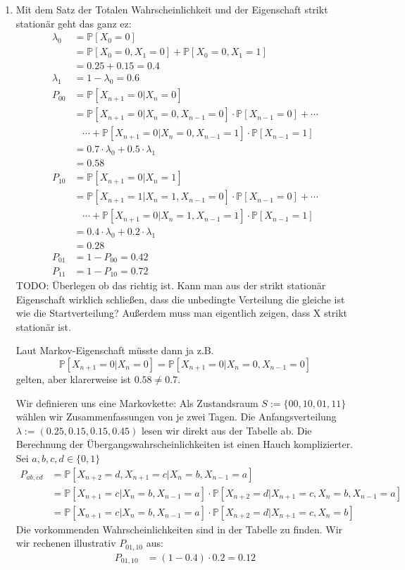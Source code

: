 \documentclass[a4paper,11pt,notitlepage,fullpage]{article}
\newcommand{\pp}[1]{\mathbb P\left[#1\right]}
\begin{document}
\begin{enumerate}
\item Mit dem Satz der Totalen Wahrscheinlichkeit und der Eigenschaft strikt stationär geht das ganz ez:
\begin{align*}
\lambda_0 &= \pp{X_0 = 0} \\
&= \pp{X_0 = 0, X_1 = 0} + \pp{X_0 = 0, X_1 = 1} \\
&= 0.25+0.15 = 0.4 \\
\lambda_1 &= 1-\lambda_0 = 0.6 \\
P_{00} &= \pp{X_{n+1} = 0 | X_n = 0} \\
&= \pp{X_{n+1} = 0 | X_n = 0, X_{n-1} = 0}\cdot\pp{X_{n-1} = 0} + \cdots \\
&~~~~\cdots + \pp{X_{n+1} = 0 | X_n = 0, X_{n-1} = 1}\cdot\pp{X_{n-1} = 1} \\
&= 0.7 \cdot \lambda_0 + 0.5 \cdot \lambda_1 \\
&= 0.58 \\
P_{10} &= \pp{X_{n+1} = 0 | X_n = 1} \\
&= \pp{X_{n+1} = 1 | X_n = 1, X_{n-1} = 0}\cdot\pp{X_{n-1} = 0} + \cdots \\
&~~~~\cdots + \pp{X_{n+1} = 0 | X_n = 1, X_{n-1} = 1}\cdot\pp{X_{n-1} = 1} \\
&= 0.4 \cdot \lambda_0 + 0.2 \cdot \lambda_1 \\
&= 0.28 \\
P_{01} &= 1 - P_{00} = 0.42 \\
P_{11} &= 1 - P_{10} = 0.72
\end{align*}
TODO: Überlegen ob das richtig ist. Kann man aus der strikt stationär Eigenschaft wirklich schließen, dass die unbedingte Verteilung die gleiche ist wie die Startverteilung? Außerdem muss man eigentlich zeigen, dass X strikt stationär ist.

Laut Markov-Eigenschaft müsste dann ja z.B. $$\pp{X_{n+1} = 0 | X_n = 0} = \pp{X_{n+1} = 0 | X_n = 0, X_{n-1} = 0}$$ gelten, aber klarerweise ist $0.58 \neq 0.7$.

Wir definieren uns eine Markovkette: Als Zustandsraum $S := \{00, 10, 01, 11\}$ wählen wir Zusammenfassungen von je zwei Tagen. Die Anfangsverteilung $\lambda := (0.25, 0.15, 0.15, 0.45)$ lesen wir direkt aus der Tabelle ab. Die Berechnung der Übergangswahrscheinlichkeiten ist einen Hauch komplizierter. Sei $a, b, c, d \in \{0, 1\}$
\begin{align*}
P_{ab, cd} &= \pp{X_{n+2} = d, X_{n+1} = c | X_n = b, X_{n-1} = a} \\
&= \pp{X_{n+1} = c | X_n = b, X_{n-1} = a} \cdot \pp{X_{n+2} = d | X_{n+1} = c, X_n = b, X_{n-1} = a} \\
&= \pp{X_{n+1} = c | X_n = b, X_{n-1} = a} \cdot \pp{X_{n+2} = d | X_{n+1} = c, X_n = b}
\end{align*}
Die vorkommenden Wahrscheinlichkeiten sind in der Tabelle zu finden. Wir wir rechenen illustrativ $P_{01,10}$ aus:
\begin{align*}
P_{01, 10} &= (1-0.4) \cdot 0.2 = 0.12
\end{align*}


\end{enumerate}
\end{document}
